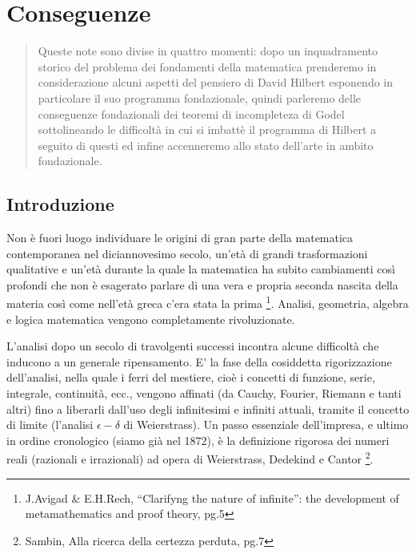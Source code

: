 
\newcommand{\noun}[1]{\textsc{#1}}
\providecommand*{\perispomeni}{\char126}

\chapter{Conseguenze}

\begin{abstract}
Queste note sono divise in quattro momenti: dopo un inquadramento
storico del problema dei fondamenti della matematica prenderemo in
considerazione alcuni aspetti del pensiero di David Hilbert esponendo
in particolare il suo programma fondazionale, quindi parleremo delle
conseguenze fondazionali dei teoremi di incompleteza di Godel sottolineando
le difficoltà in cui si imbattè il programma di Hilbert a seguito
di questi ed infine accenneremo allo stato dell'arte in ambito fondazionale.
\end{abstract}

\section{Introduzione}

Non è fuori luogo individuare le origini di gran parte della matematica
contemporanea nel diciannovesimo secolo, un'età di grandi trasformazioni
qualitative e un'età durante la quale la matematica ha subito cambiamenti
così profondi che non è esagerato parlare di una vera e propria seconda
nascita della materia così come nell'età greca c'era stata la prima%
\footnote{J.Avigad \& E.H.Rech, {}``Clarifyng the nature of infinite'': the
development of metamathematics and proof theory, pg.5%
}. Analisi, geometria, algebra e logica matematica vengono completamente
rivoluzionate.

L'analisi dopo un secolo di travolgenti successi incontra alcune difficoltà
che inducono a un generale ripensamento. E' la fase della cosiddetta
rigorizzazione dell\textquoteright{}analisi, nella quale i ferri del
mestiere, cioè i concetti di funzione, serie, integrale, continuità,
ecc., vengono affinati (da Cauchy, Fourier, Riemann e tanti altri)
fino a liberarli dall\textquoteright{}uso degli infinitesimi e infiniti
attuali, tramite il concetto di limite (l\textquoteright{}analisi
$\epsilon - \delta$ di Weierstrass). Un passo
essenziale dell\textquoteright{}impresa, e ultimo in ordine cronologico
(siamo già nel 1872), è la definizione rigorosa dei numeri reali (razionali
e irrazionali) ad opera di Weierstrass, Dedekind e Cantor%
\footnote{Sambin, Alla ricerca della certezza perduta, pg.7%
}.

